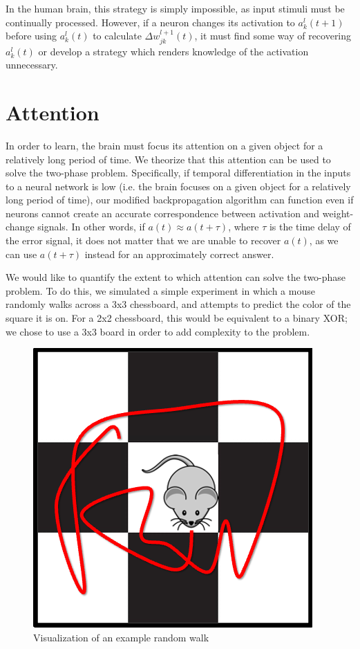 \documentclass[12pt]{article}
\begin{document}
In the human brain, this strategy is simply impossible, as input stimuli must be continually processed. However, if a neuron changes its activation to $a^l_k(t+1)$ before using $a^l_k(t)$ to calculate $\Delta w_{jk}^{l+1}(t)$, it must find some way of recovering $a^l_k(t)$ or develop a strategy which renders knowledge of the activation unnecessary.

\section{Attention}
In order to learn, the brain must focus its attention on a given object for a relatively long period of time. \cite{Desimone2014} We theorize that this attention can be used to solve the two-phase problem. Specifically, if temporal differentiation in the inputs to a neural network is low (i.e. the brain focuses on a given object for a relatively long period of time), our modified backpropagation algorithm can function even if neurons cannot create an accurate correspondence between activation and weight-change signals. In other words, if $a(t)\approx a(t+\tau)$, where $\tau$ is the time delay of the error signal, it does not matter that we are unable to recover $a(t)$, as we can use $a(t+\tau)$ instead for an approximately correct answer.

We would like to quantify the extent to which attention can solve the two-phase problem. To do this, we simulated a simple experiment in which a mouse randomly walks across a 3x3 chessboard, and attempts to predict the color of the square it is on. For a 2x2 chessboard, this would be equivalent to a binary XOR; we chose to use a 3x3 board in order to add complexity to the problem.

\begin{figure}
	\includegraphics[scale=0.4]{mouse_chessboard}\centering
	\caption{Visualization of an example random walk}
\end{figure}
\end{document}
